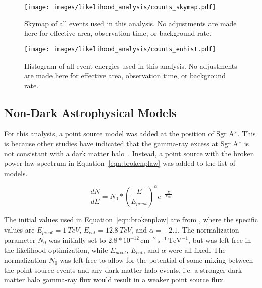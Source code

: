   \begin{figure}[ht]
    \centering
    \texttt{[image: images/likelihood\_analysis/counts\_skymap.pdf]}
    \caption[Galactic Center Counts Skymap]{
      Skymap of all events used in this analysis.
      No adjustments are made here for effective area, observation time, or background rate.
    }
    \label{fig:gc_counts_skymap}
  \end{figure}
  
  \begin{figure}[h]
    \centering
    \texttt{[image: images/likelihood\_analysis/counts\_enhist.pdf]}
    \caption[Galactic Center Counts Energy Histogram]{
      Histogram of all event energies used in this analysis.
      No adjustments are made here for effective area, observation time, or background rate.
    }
    \label{fig:gc_counts_enhist}
  \end{figure}

  \FloatBarrier

  \subsection{Non-Dark Astrophysical Models}
  For this analysis, a point source model was added at the position of Sgr A*.
  This is because other studies have indicated that the gamma-ray excess at Sgr A* is not consistant with a dark matter halo~\cite{gc_pnt_is_not_dm1, gc_pnt_is_not_dm2, gc_pnt_is_not_dm3}.
  Instead, a point source with the broken power law spectrum in Equation~\ref{eqn:brokenplaw} was added to the list of models.
  
  \begin{equation}\label{eqn:brokenplaw}
    \frac{dN}{dE} = N_{0} * { \left ( \frac{E}{E_{pivot}} \right ) }^{\alpha} {e}^{-\frac{E}{E_{cut}}}
  \end{equation}
  
  The initial values used in Equation~\ref{eqn:brokenplaw} are from \cite{VeritasGCRidge2015}, where the specific values are $E_{pivot}=\SI{1}{TeV}$, $E_{cut}=\SI{12.8}{TeV}$, and $\alpha=-2.1$.
  The normalization parameter $N_{0}$ was initially set to $2.8*{10}^{-12}\,\text{cm}^{-2}\,\text{s}^{-1}\,\text{TeV}^{-1}$, but was left free in the likelihood optimization, while $E_{pivot}$, $E_{cut}$, and $\alpha$ were all fixed.
  The normalization $N_{0}$ was left free to allow for the potential of some mixing between the point source events and any dark matter halo events, i.e. a stronger dark matter halo gamma-ray flux would result in a weaker point source flux.
  
